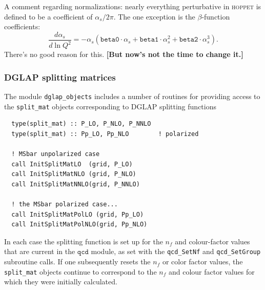 \documentclass[12pt]{article}
\newcommand{\as}{\alpha_s}
\newcommand{\comment}[1]{\textbf{[#1]}}
\newcommand{\hoppet}{\textsc{hoppet}\xspace}
\newcommand{\ttt}[1]{\texttt{#1}}
\begin{document}
A comment regarding normalizations: nearly everything perturbative in
\hoppet is defined to be a coefficient of $\as/2\pi$. The one
exception is the $\beta$-function coefficients:
\begin{equation}
  \label{eq:as-ev}
  \frac{d\as}{d\ln Q^2} = -\as (\ttt{beta0}\cdot \as +
  \ttt{beta1}\cdot \as^2 + 
  \ttt{beta2} \cdot\as^3).
\end{equation}
There's no good reason for this. \comment{But now's not the time to
  change it.}

\subsubsection{DGLAP splitting matrices}
\label{sec:dglap-split}

The module \ttt{dglap\_objects} includes a number of routines for
providing access to the \ttt{split\_mat} objects corresponding to
DGLAP splitting functions
\begin{verbatim}
  type(split_mat) :: P_LO, P_NLO, P_NNLO
  type(split_mat) :: Pp_LO, Pp_NLO        ! polarized

  ! MSbar unpolarized case
  call InitSplitMatLO  (grid, P_LO)
  call InitSplitMatNLO (grid, P_NLO)
  call InitSplitMatNNLO(grid, P_NNLO)

  ! the MSbar polarized case...
  call InitSplitMatPolLO (grid, Pp_LO)
  call InitSplitMatPolNLO(grid, Pp_NLO)
\end{verbatim}
In each case the splitting function is set up for the $n_f$ and
colour-factor values that are current in the $\ttt{qcd}$ module, as
set with the \ttt{qcd\_SetNf} and \ttt{qcd\_SetGroup} subroutine calls. If one
subsequently resets the $n_f$ or color factor values, the \ttt{split\_mat}
objects continue to correspond to the $n_f$ and colour factor values
for which they were initially calculated.
\end{document}
